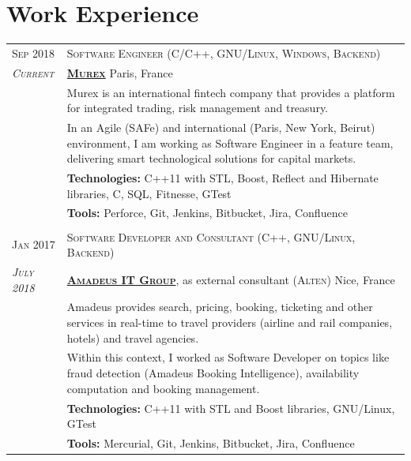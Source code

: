 \documentclass[a4paper,10pt]{article}
\begin{document}
	\vspace{-5mm}

	\section{Work Experience}
	\begin{tabular}{p{1.7cm}|p{15.5cm}}
		\centering\textsc{Sep 2018} &
		\textsc{Software Engineer (C/C++, GNU/Linux, Windows, Backend)} \\
		\centering\emph{\textsc{Current}} &
		\textsc{\textbf{\href{https://www.murex.com/}{Murex}}}  \hfill Paris, France\\
		& Murex is an international fintech company that provides a platform for integrated trading, risk management and treasury.\\
		& In an Agile (SAFe) and international (Paris, New York, Beirut) environment, I am working as Software Engineer in a feature team, delivering smart technological solutions for capital markets.\\
		& \textbf{Technologies:} C++11 with STL, Boost, Reflect and Hibernate libraries, C, SQL, Fitnesse, GTest\\
		& \textbf{Tools:} Perforce, Git, Jenkins, Bitbucket, Jira, Confluence\\
		
		\multicolumn{2}{c}{} \\
		\centering\textsc{Jan 2017} &
		\textsc{Software Developer and Consultant (C++, GNU/Linux, Backend)} \\
		\centering\emph{\textsc{July 2018}} &
		\textsc{\textbf{\href{http://www.amadeus.com/}{Amadeus IT Group}}}, as external consultant (\textsc{Alten}) \hfill Nice, France\\
		& Amadeus provides search, pricing, booking, ticketing and other services in real-time to travel providers (airline and rail companies, hotels) and travel agencies.\\
		& Within this context, I worked as Software Developer on topics like fraud detection (Amadeus Booking Intelligence), availability computation and booking management.\\		
		& \textbf{Technologies:} C++11 with STL and Boost libraries, GNU/Linux, GTest\\
		& \textbf{Tools:} Mercurial, Git, Jenkins, Bitbucket, Jira, Confluence\\


\end{tabular}
\end{document}
